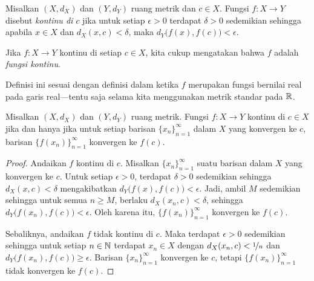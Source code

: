 \begin{defn}
Misalkan $(X,d_X)$ dan $(Y,d_Y)$ ruang metrik dan $c \in X$.
Fungsi $f \colon X \to Y$ disebut
\emph{kontinu di $c$}
jika untuk setiap $\epsilon > 0$
terdapat $\delta > 0$ sedemikian sehingga apabila $x \in X$ dan $d_X(x,c) <
\delta$, maka
$d_Y\bigl(f(x),f(c)\bigr) < \epsilon$.

\medskip

Jika $f \colon X \to Y$ kontinu di setiap $c \in X$, kita cukup mengatakan
bahwa $f$ adalah \emph{fungsi kontinu}.
\end{defn}

Definisi ini sesuai dengan definisi dalam  ketika
$f$ merupakan fungsi bernilai real pada garis real---tentu saja selama kita
menggunakan metrik standar pada ${\mathbb{R}}$.

\begin{prop} \label{prop:contiscont}
Misalkan $(X,d_X)$ dan $(Y,d_Y)$ ruang metrik.
Fungsi $f \colon X \to Y$
kontinu di $c \in X$
jika dan hanya jika untuk setiap barisan $\{ x_n \}_{n=1}^\infty$ dalam $X$
yang konvergen ke $c$, barisan $\bigl\{ f(x_n) \bigr\}_{n=1}^\infty$ konvergen
ke $f(c)$.
\end{prop}

\begin{proof}
Andaikan $f$ kontinu di $c$.  Misalkan $\{ x_n \}_{n=1}^\infty$ suatu
barisan dalam $X$ yang konvergen ke $c$.  Untuk setiap $\epsilon > 0$,
terdapat $\delta > 0$ sedemikian sehingga $d_X(x,c) < \delta$ mengakibatkan
$d_Y\bigl(f(x),f(c)\bigr) < \epsilon$.  Jadi, ambil $M$ sedemikian sehingga
untuk semua $n \geq M$, berlaku $d_X(x_n,c) < \delta$, sehingga
$d_Y\bigl(f(x_n),f(c)\bigr) < \epsilon$.  Oleh karena itu, $\bigl\{ f(x_n) \bigr\}_{n=1}^\infty$
konvergen ke $f(c)$.

Sebaliknya, andaikan $f$ tidak kontinu di $c$.
Maka terdapat $\epsilon > 0$
sedemikian sehingga untuk setiap $n \in {\mathbb{N}}$ terdapat $x_n \in X$
dengan
$d_X(x_n,c) < \nicefrac{1}{n}$ dan $d_Y\bigl(f(x_n),f(c)\bigr) \geq
\epsilon$.  Barisan $\{ x_n \}_{n=1}^\infty$ konvergen ke $c$, tetapi
$\bigl\{ f(x_n) \bigr\}_{n=1}^\infty$
tidak konvergen ke $f(c)$.
\end{proof}

